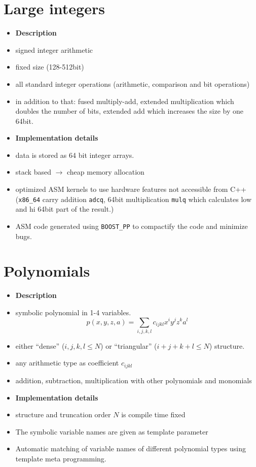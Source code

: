 \documentclass[oribibl]{llncs2e/llncs}
\begin{document}

\section{Large integers}
\begin{itemize}
\item {\bf Description}
\item signed integer arithmetic
\item fixed size (128-512bit)
\item all standard integer operations (arithmetic, comparison and bit operations)
\item in addition to that: fused multiply-add, extended multiplication which doubles the number of bits, extended add which increases the size by one 64bit.
\item {\bf Implementation details}
\item data is stored as 64 bit integer arrays.
\item stack based $\rightarrow$ cheap memory allocation
\item optimized ASM kernels to use hardware features not accessible from C++ (\verb|x86_64| carry addition \verb|adcq|, 64bit multiplication \verb|mulq| which calculates low and hi 64bit part of the result.)
\item ASM code generated using \verb|BOOST_PP| to compactify the code and minimize bugs.
\end{itemize}

\section{Polynomials}
\begin{itemize}
\item {\bf Description}
\item symbolic polynomial in 1-4 variables.
\begin{equation}
    p(x,y,z,a) = \sum_{i,j,k,l} c_{ijkl} x^i y^j z^k a^l
\end{equation}
\item either ``dense'' (${i,j,k,l} \le N$) or ``triangular'' ($i+j+k+l \le N$) structure.
\item any arithmetic type as coefficient $c_{ijkl}$
\item addition, subtraction, multiplication with other polynomials and monomials
\item {\bf Implementation details}
\item structure and truncation order $N$ is compile time fixed 
\item The symbolic variable names are given as template parameter
\item Automatic matching of variable names of different polynomial types using template meta programming.
\end{itemize}
\end{document}
